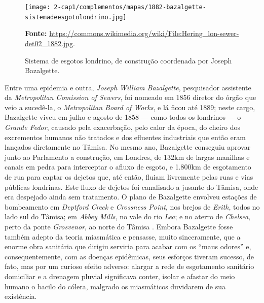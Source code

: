 \begin{figure}
\centering
\caption{Sistema de esgotos londrino, de construção coordenada por Joseph Bazalgette.}
\texttt{[image: 2-cap1/complementos/mapas/1882-bazalgette-sistemadeesgotolondrino.jpg]}{\par \footnotesize \textbf{Fonte:} \url{https://commons.wikimedia.org/wiki/File:Hering_lon-sewer-det02_1882.jpg}. \par}
\label{fig:esgotoslondres1882} 
\end{figure}

Entre uma epidemia e outra, \textit{Joseph William Bazalgette}, pesquisador assistente da \textit{Metropolitan Comission of Sewers}, foi nomeado em 1856 diretor do órgão que veio a sucedê-la, o \textit{Metropolitan Board of Works}, e lá ficou até 1889; neste cargo, Bazalgette viveu em julho e agosto de 1858 --- como todos os londrinos --- o \textit{Grande Fedor}, causado pela exacerbação, pelo calor da época, do cheiro dos excrementos humanos não tratados e dos efluentes industriais que então eram lançados diretamente no Tâmisa. No mesmo ano, Bazalgette conseguiu aprovar junto ao Parlamento a construção, em Londres, de 132km de largas manilhas e canais em pedra para interceptar o afluxo de esgoto, e 1.800km de esgotamento de rua para captar os dejetos que, até então, fluiam livremente pelas ruas e vias públicas londrinas. Este fluxo de dejetos foi canalisado a jusante do Tâmisa, onde era despejado ainda sem tratamento. O plano de Bazalgette envolveu estações de bombeamento em \textit{Deptford Creek} e \textit{Crossness Point}, nos brejos de \textit{Erith}, todos no lado sul do Tâmisa; em \textit{Abbey Mills}, no vale do rio \textit{Lea}; e no aterro de \textit{Chelsea}, perto da ponte \textit{Grosvenor}, ao norte do Tâmisa \cite{bazalgette_london_1865, bazalgette_metropolitan_1865}. Embora Bazalgette fosse também adepto da teoria miasmática e pensasse, muito sinceramente, que a enorme obra sanitária que dirigiu serviria para acabar com os ``maus odores'' e, consequentemente, com as doenças epidêmicas, seus esforços tiveram sucesso, de fato, mas por um curioso efeito adverso: alargar a rede de esgotamento sanitário domiciliar e a drenagem pluvial significava conter, isolar e afastar do meio humano o bacilo do cólera, malgrado os miasmáticos duvidarem de sua existência.

